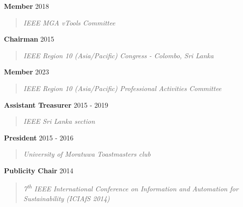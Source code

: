 \documentclass[mm]{res} %
\begin{document}
\begin{resume}
\textbf{Member} \hfill 2018 
\begin{quote}
\emph{IEEE MGA vTools Committee}
\end{quote}

\textbf{Chairman} \hfill 2015 
\begin{quote}
\emph{IEEE Region 10 (Asia/Pacific) Congress - Colombo, Sri Lanka}
\end{quote}

\textbf{Member} \hfill 2023 
\begin{quote}
	\emph{IEEE Region 10 (Asia/Pacific) Professional Activities Committee}
\end{quote}

\textbf{Assistant Treasurer} \hfill 2015 - 2019
\begin{quote}
\emph{IEEE Sri Lanka section}
\end{quote}


\textbf{President} \hfill 2015 - 2016 
\begin{quote}
\emph{University of Moratuwa Toastmasters club}
\end{quote}




\textbf{Publicity Chair} \hfill 2014 
\begin{quote}
\emph{7\textsuperscript{th} IEEE International Conference on Information and Automation for Sustainability (ICIAfS 2014)}
\end{quote}


\end{resume}
\end{document}
